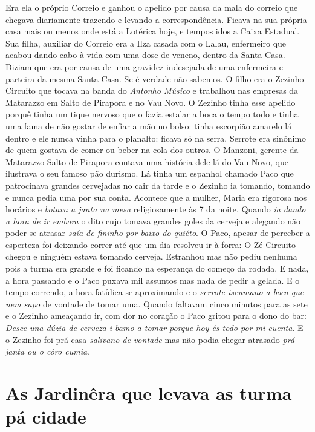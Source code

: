 \documentclass[12pt,brazil,]{book}
\begin{document}
Era ela o próprio Correio e ganhou o apelido por causa da mala do
correio que chegava diariamente trazendo e levando a correspondência.
Ficava na sua própria casa mais ou menos onde está a Lotérica hoje, e
tempos idos a Caixa Estadual. Sua filha, auxiliar do Correio era a Ilza
casada com o Lalau, enfermeiro que acabou dando cabo à vida com uma dose
de veneno, dentro da Santa Casa. Diziam que era por causa de uma
gravidez indesejada de uma enfermeira e parteira da mesma Santa Casa. Se
é verdade não sabemos. O filho era o Zezinho Circuito que tocava na
banda do \emph{Antonho Músico} e trabalhou nas empresas da Matarazzo em
Salto de Pirapora e no Vau Novo. O Zezinho tinha esse apelido porquê
tinha um tique nervoso que o fazia estalar a boca o tempo todo e tinha
uma fama de não gostar de enfiar a mão no bolso: tinha escorpião amarelo
lá dentro e ele nunca vinha para o planalto: ficava só na serra. Serrote
era sinônimo de quem gostava de comer ou beber na cola dos outros. O
Manzoni, gerente da Matarazzo Salto de Pirapora contava uma história
dele lá do Vau Novo, que ilustrava o seu famoso pão durismo. Lá tinha um
espanhol chamado Paco que patrocinava grandes cervejadas no cair da
tarde e o Zezinho ia tomando, tomando e nunca pedia uma por sua conta.
Acontece que a mulher, Maria era rigorosa nos horários e \emph{botava a
janta na mesa} religiosamente às 7 da noite. Quando \emph{ia dando a
hora de ir embora} o dito cujo tomava grandes goles da cerveja e
alegando não poder se atrasar \emph{saía de fininho por baixo do
quiéto}. O Paco, apesar de perceber a esperteza foi deixando correr até
que um dia resolveu ir à forra: O Zé Circuito chegou e ninguém estava
tomando cerveja. Estranhou mas não pediu nenhuma pois a turma era grande
e foi ficando na esperança do começo da rodada. E nada, a hora passando
e o Paco puxava mil assuntos mas nada de pedir a gelada. E o tempo
correndo, a hora fatídica se aproximando e o \emph{serrote iscumano a
boca que nem sapo} de vontade de tomar uma. Quando faltavam cinco
minutos para as sete e o Zezinho ameaçando ir, com dor no coração o Paco
gritou para o dono do bar: \emph{Desce una dúzia de cerveza i bamo a
tomar porque hoy és todo por mi cuenta}. E o Zezinho foi prá casa
\emph{salivano de vontade} mas não podia chegar atrasado \emph{prá janta
ou o côro cumia}.

\section{As Jardinêra que levava as turma pá
cidade}\label{as-jardinuxeara-que-levava-as-turma-puxe1-cidade}
\end{document}
